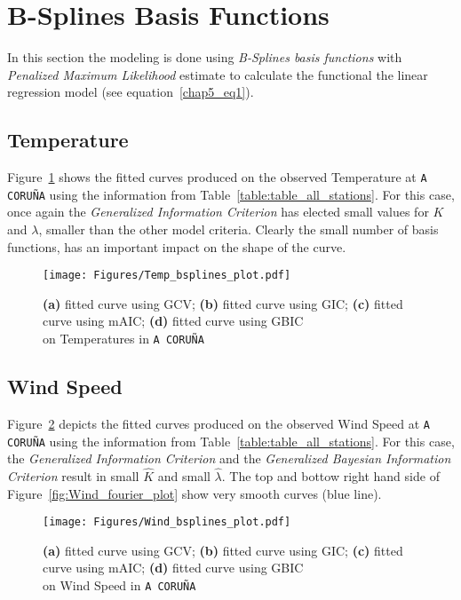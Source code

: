 \section{B-Splines Basis Functions}
In this section the modeling is done using \textit{B-Splines basis functions} with \textit{Penalized Maximum Likelihood} estimate to calculate the functional the linear regression model (see equation~\eqref{chap5_eq1}). 

\subsection{Temperature}
Figure~\ref{fig:Temp_bsplines} shows the fitted curves produced on the observed Temperature at \texttt{A CORUÑA} using the information from Table~\ref{table:table_all_stations}. For this case, once again the \textit{Generalized Information Criterion} has elected small values for $K$ and $\lambda$, smaller than the other model criteria. Clearly the small number of basis functions, has an important impact on the shape of the curve.


\begin{figure}[th]
    \texttt{[image: Figures/Temp\_bsplines\_plot.pdf]}
  \caption[Fitting Temperature with \textit{Gaussian basis function} on \texttt{A CORUÑA} station]{\textbf{(a)} fitted curve using GCV; \textbf{(b)} fitted curve using GIC; \textbf{(c)} fitted curve using mAIC; \textbf{(d)} fitted curve using GBIC \\ on Temperatures in \texttt{A CORUÑA} }
  \label{fig:Temp_bsplines}
\end{figure}
\clearpage
\subsection{Wind Speed}
Figure~\ref{fig:Wind_bsplines_plot} depicts the fitted curves produced on the observed Wind Speed at \texttt{A CORUÑA} using the information from Table~\ref{table:table_all_stations}. For this case, the \textit{Generalized Information Criterion} and the \textit{Generalized Bayesian Information Criterion} result in small $\hat{K}$ and small $\hat{\lambda}$. The top and bottow right hand side of Figure~\ref{fig:Wind_fourier_plot} show very smooth curves (blue line).

\begin{figure}[th]
    \texttt{[image: Figures/Wind\_bsplines\_plot.pdf]}
  \caption[Fitting Wind Speed with \textit{B-Splines basis function} on \texttt{A CORUÑA} station]{\textbf{(a)} fitted curve using GCV; \textbf{(b)} fitted curve using GIC; \textbf{(c)} fitted curve using mAIC; \textbf{(d)} fitted curve using GBIC \\ on Wind Speed in \texttt{A CORUÑA}}
  \label{fig:Wind_bsplines_plot}
\end{figure}
